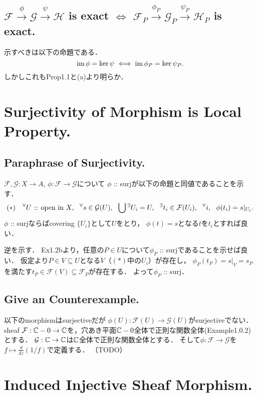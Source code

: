\documentclass[a4paper]{jsarticle}
\newcommand{\shF}{\mathcal{F}}
\newcommand{\shG}{\mathcal{G}}
\newcommand{\shH}{\mathcal{H}}
\begin{document}
    \subsection{$\shF \xrightarrow{\phi} \shG \xrightarrow{\psi} \shH$ is exact $\iff$
        $\shF_P \xrightarrow{\phi_P} \shG_P \xrightarrow{\psi_P} \shH_P$ is exact.}
    示すべきは以下の命題である．
    \[ \operatorname{im} \phi=\ker \psi \iff \operatorname{im} \phi_P=\ker \psi_P. \]
    しかしこれもProp1.1と(a)より明らか．


\section{Surjectivity of Morphism is Local Property.} %
    \subsection{Paraphrase of Surjectivity.}
    $\shF, \shG: X \to A$, $\phi: \shF \to \shG$について
    $\phi$ :: surjが以下の命題と同値であることを示す．
    \[
        (*)~~~
        \Forall{U \text{ :: open in } X}
        \Forall{s \in \shG(U)}
        \bigcup {}^\exists U_i=U,~~
        \Exists{t_i \in \shF(U_i)}
        \Forall{i} \phi(t_i)=s|_{U_i}.
    \]
    $\phi$ :: surjならばcovering $\{U_i\}$として$U$をとり，
    $\phi(t)=s$となる$t$を$t_i$とすれば良い．

    逆を示す．
    Ex1.2bより，任意の$P \in U$について$\phi_P$ :: surjであることを示せば良い．
    仮定より$P \in V \subseteq U$となる$V$（$(*)$中の$U_i$）が存在し，
    $\phi_P(t_P)=s|_V=s_P$を満たす$t_P \in \shF(V) \subseteq \shF_P$が存在する．
    よって$\phi_P$ :: surj．

    \subsection{Give an Counterexample.}
    以下のmorphismはsurjectiveだが
    $\phi(U): \shF(U) \to \shG(U)$がsurjectiveでない．
    sheaf $\shF:\C-0 \to \C$を，穴あき平面$\mathbb{C}-0$全体で正則な関数全体(Example1.0.2)とする．
    $\shG: \C \to \C$は$\mathbb{C}$全体で正則な関数全体とする．
    そして$\phi: \shF \to \shG$を$f \mapsto \frac{d}{dz}(1/f)$で定義する．
    （TODO）

\section{Induced Injective Sheaf Morphism.} %
\end{document}
